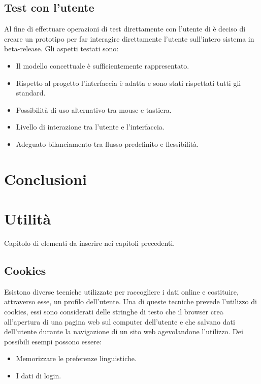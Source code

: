 \documentclass[a4paper,final,12pt]{report}
\begin{document}
\section{Test con l'utente}
Al fine di effettuare operazioni di test direttamente con l'utente di è deciso di creare un prototipo per far interagire direttamente l'utente sull'intero sistema in beta-release.
Gli aspetti testati sono:
\begin{itemize}
\item Il modello concettuale è sufficientemente rappresentato.
\item Rispetto al progetto l'interfaccia è adatta e sono stati rispettati tutti gli standard.
\item Possibilità di uso alternativo tra mouse e tastiera.
\item Livello di interazione tra l'utente e l'interfaccia.
\item Adeguato bilanciamento tra flusso predefinito e flessibilità.
\end{itemize}
\chapter{Conclusioni}

\chapter{Utilità}
Capitolo di elementi da inserire nei capitoli precedenti.

\section{Cookies}
Esistono diverse tecniche utilizzate per raccogliere i dati online e costituire, attraverso esse, un profilo dell'utente. Una di queste tecniche prevede l'utilizzo di cookies, essi sono considerati delle stringhe di testo che il browser crea all'apertura di una pagina web sul computer dell'utente e che salvano dati dell'utente durante la navigazione di un sito web agevolandone l'utilizzo. Dei possibili esempi possono essere:
\begin{itemize}
\item Memorizzare le preferenze linguistiche.
\item I dati di login.
\end{itemize}
\end{document}
